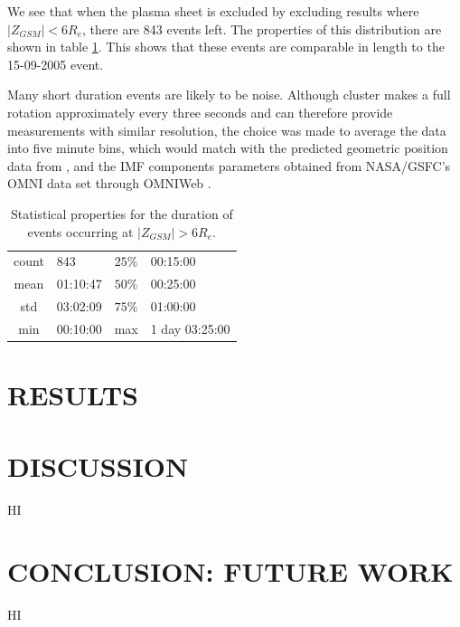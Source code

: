 \documentclass{article}
\begin{document}
We see that when the plasma sheet is excluded by excluding results where $|Z_{GSM}|<6R_e$, there are 843 events left. The properties of this distribution are shown in table \ref{tab:event_durn}. This shows that these events are comparable in length to the 15-09-2005 event.

Many short duration events are likely to be noise. Although cluster makes a full rotation approximately every three seconds and can therefore provide measurements with similar resolution, the choice was made to average the data into five minute bins, which would match with the predicted geometric position data from \cite{cdms}, and the IMF components parameters obtained from NASA/GSFC's OMNI data set through OMNIWeb \cite{omniData}.

\begin{table}[]
    \begin{minipage}[c]{0.57\textwidth}
        \centering
        \begin{tabular}{||c|l||c|l||}
            \hline
            count & 843 & $25\%$ & 00:15:00 \\
            mean & 01:10:47 & $50\%$ & 00:25:00 \\
            std & 03:02:09 & $75\%$ & 01:00:00 \\
            min & 00:10:00 & max & 1 day 03:25:00 \\
            \hline
        \end{tabular}
    \end{minipage}\hfill
    \begin{minipage}[c]{0.4\textwidth}
        \caption{Statistical properties for the duration of events occurring at $|Z_{GSM}|>6R_e$.}
        \label{tab:event_durn}
    \end{minipage}
\end{table}

\section{RESULTS}

\section{DISCUSSION}
HI

\section{CONCLUSION: FUTURE WORK}
HI

\printbibliography
\end{document}

